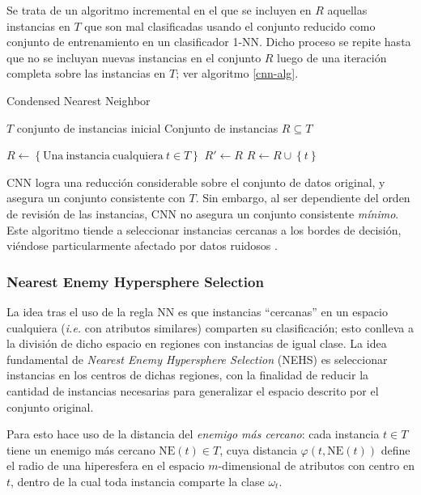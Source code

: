 Se trata de un algoritmo incremental en el que se incluyen en $R$ aquellas instancias en $T$ que son mal clasificadas usando el conjunto reducido como conjunto de entrenamiento en un clasificador 1-NN. Dicho proceso se repite hasta que no se incluyan nuevas instancias en el conjunto $R$ luego de una iteración completa sobre las instancias en $T$; ver algoritmo \ref{cnn-alg}.

\begin{algorithm}
\caption{Condensed Nearest Neighbor}
\label{cnn-alg}
\begin{algorithmic}[1]

\Require $T$ conjunto de instancias inicial
\Ensure Conjunto de instancias $R \subseteq T$

\State $R \gets \left\lbrace \mathrm{Una\ instancia\ cualquiera}\ t \in T \right\rbrace$
\Repeat
	\State $R' \gets R$
			\State $R \gets R \cup \left\lbrace t \right\rbrace$
		\EndIf
	\EndFor
{}
\State {}
\end{algorithmic}
\end{algorithm}

CNN logra una reducción considerable sobre el conjunto de datos original, y asegura un conjunto consistente con $T$. Sin embargo, al ser dependiente del orden de revisión de las instancias, CNN no asegura un conjunto consistente \emph{mínimo}. Este algoritmo tiende a seleccionar instancias cercanas a los bordes de decisión, viéndose particularmente afectado por datos ruidosos \cite{amal2011survey, Jankowski_comparisonof}.

\subsubsection{Nearest Enemy Hypersphere Selection}

La idea tras el uso de la regla NN es que instancias ``cercanas'' en un espacio cualquiera (\emph{i.e.} con atributos similares) comparten su clasificación; esto conlleva a la división de dicho espacio en regiones con instancias de igual clase. La idea fundamental de \emph{Nearest Enemy Hypersphere Selection} (NEHS) es seleccionar instancias en los centros de dichas regiones, con la finalidad de reducir la cantidad de instancias necesarias para generalizar el espacio descrito por el conjunto original.

Para esto hace uso de la distancia del \emph{enemigo más cercano}: cada instancia $t \in T$ tiene un enemigo más cercano $\mathrm{NE}(t) \in T$, cuya distancia $\varphi(t,\mathrm{NE}(t))$ define el radio de una hiperesfera en el espacio $m$-dimensional de atributos con centro en $t$, dentro de la cual toda instancia comparte la clase $\omega_t$.

